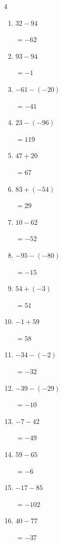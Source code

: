 \begin{multicols}{4}
\begin{enumerate}
        $=-36$

  \item $32-94$

        $=-62$

  \item $93-94$

        $=-1$

  \item $-61-(-20)$

        $=-41$

\columnbreak %

\resetques

  \item $23-(-96)$

        $=119$

  \item $47+20$

        $=67$

  \item $83+(-54)$

        $=29$

  \item $10-62$

        $=-52$

  \item $-95-(-80)$

        $=-15$

  \item $54+(-3)$

        $=51$

  \item $-1+59$

        $=58$

  \item $-34-(-2)$

        $=-32$

  \item $-39-(-29)$

        $=-10$

  \item $-7-42$

        $=-49$

  \item $59-65$

        $=-6$

  \item $-17-85$

        $=-102$

  \item $40-77$

        $=-37$


\end{enumerate}
\end{multicols}
